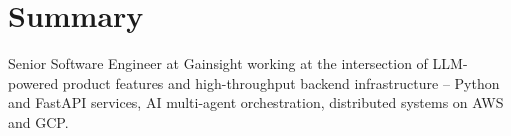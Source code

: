 \section{Summary}
\small Senior Software Engineer at Gainsight working at the intersection of LLM-powered product features and high-throughput backend infrastructure -- Python and FastAPI services, AI multi-agent orchestration, distributed systems on AWS and GCP.
\vspace{2pt}
